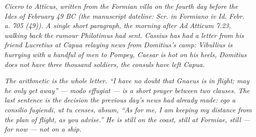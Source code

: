 
\textit{Cicero to Atticus, written from the Formian
villa on the fourth day before the Ides of February
49 BC (the manuscript dateline:
\textit{Scr. in Formiano iv Id. Febr. a. 705 (49)}).
A single short paragraph, the morning after \emph{Ad
Atticum} 7.23, walking back the rumour Philotimus had
sent. Cassius has had a letter from his friend
Lucretius at Capua relaying news from Domitius's
camp: Vibullius is hurrying with a handful of men to
Pompey, Caesar is hot on his heels, Domitius does not
have three thousand soldiers, the consuls have left
Capua.}

\textit{The arithmetic is the whole letter. ``I have
no doubt that Gnaeus is in flight; may he only get
away'' --- \emph{modo effugiat} --- is a short prayer
between two clauses. The last sentence is the
decision the previous day's news had already made:
\emph{ego a consilio fugiendi, ut tu censes, absum},
``As for me, I am keeping my distance from the plan
of flight, as you advise.'' He is still on the coast,
still at Formiae, still --- for now --- not on a
ship.}
